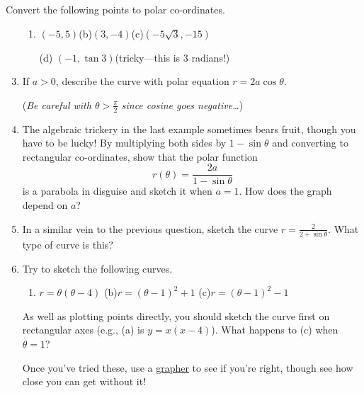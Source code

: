 \begin{exercises}{}{}
	\exstart Convert the following points to polar co-ordinates.
	\begin{enumerate}\setcounter{enumi}{1}
	  \item[]\begin{enumerate}
	    \item $(-5,5)$\qquad (b)\lstsp $(3,-4)$\qquad (c)\lstsp $(-5\sqrt 3,-15)$
	    \item[(d)] $(-1,\tan 3)$\quad (tricky---this is 3 radians!)
	  \end{enumerate}
	  
	  \item If $a>0$, describe the curve with polar equation $r=2a\cos\theta$.\par
	  (\emph{Be careful with $\theta>\frac\pi 2$ since cosine goes negative\ldots})
	  
	  \item The algebraic trickery in the last example sometimes bears fruit, though you have to be lucky! By multiplying both sides by $1-\sin\theta$ and converting to rectangular co-ordinates, show that the polar function
		\[
			r(\theta)=\frac{2a}{1-\sin\theta}
		\]
		is a parabola in disguise and sketch it when $a=1$. How does the graph depend on $a$?
		
		
		\item In a similar vein to the previous question, sketch the curve $r=\frac 2{2+\sin\theta}$. What type of curve is this?
		
		 
	  \item Try to sketch the following curves.
		\begin{enumerate}
	  	\item $r=\theta(\theta-4)$\qquad 
	  	(b)\lstsp $r=(\theta-1)^2+1$\qquad 
	  	(c)\lstsp $r=(\theta-1)^2-1$
		\end{enumerate}
		As well as plotting points directly, you should sketch the curve first on rectangular axes (e.g.,{} (a) is $y=x(x-4)$). What happens to (c) when $\theta=1$?\par
		Once you've tried these, use a \href{https://www.desmos.com/calculator}{grapher} to see if you're right, though see how close you can get without it! 
	\end{enumerate}
\end{exercises}


